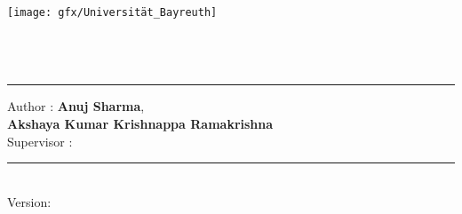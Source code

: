 %
\begin{titlepage}
	\texttt{[image: gfx/Universität\_Bayreuth]} \\[2mm]
	\textsf{\thesisUniversityDepartment} \\
	\textsf{\thesisUniversityInstitute} \\
	\textsf{\thesisUniversityGroup} \\
	\textsf{\departmentHead}

		\flushright
	\vfill
	{\LARGE\thesisTitle \par}
	\rule[5pt]{\textwidth}{.4pt} \par
	\textbf{\Large\thesisName}
	\vfill
	\begin{flushleft}
		Author : \textbf{Anuj Sharma}, \\
		\hspace*{1.5cm}\textbf{Akshaya Kumar Krishnappa Ramakrishna}\\[2mm]
		Supervisor : \textbf{\thesisFirstSupervisor}
	\end{flushleft}
	\rule[5pt]{\textwidth}{.4pt} \par
	\textit{\large\thesisDate} \\
	Version: \thesisVersion
\end{titlepage}
